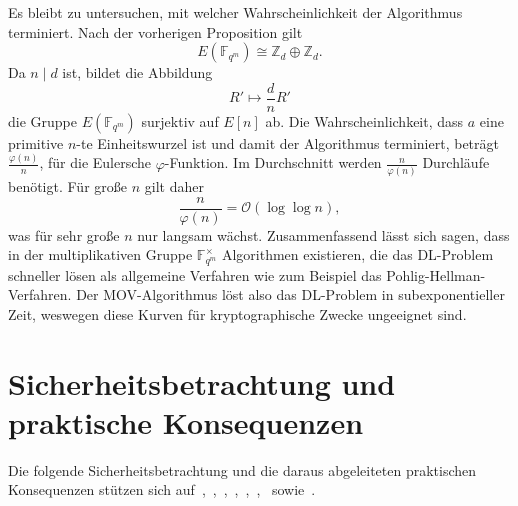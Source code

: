 Es bleibt zu untersuchen, mit welcher Wahrscheinlichkeit der Algorithmus terminiert. Nach der vorherigen Proposition gilt
\[
    E(\mathbb{F}_{q^m})
    \cong \mathbb{Z}_d\oplus\mathbb{Z}_d.
\]
Da $n\mid d$ ist, bildet die Abbildung
\[
    R'\longmapsto \frac{d}{n}R'
\]
die Gruppe $E(\mathbb F_{q^m})$ surjektiv auf $E[n]$ ab.
Die Wahrscheinlichkeit, dass $a$ eine primitive $n$-te Einheitswurzel ist und damit der Algorithmus terminiert, beträgt $\frac{\varphi(n)}{n}$, für die Eulersche $\varphi$-Funktion. Im Durchschnitt werden $\frac{n}{\varphi(n)}$ Durchläufe benötigt. Für große $n$ gilt daher
\[
\frac{n}{\varphi(n)}=\mathcal{O}(\log\log n),
\]
was für sehr große $n$ nur langsam wächst. Zusammenfassend lässt sich sagen, dass in der multiplikativen Gruppe $\mathbb{F}_{q^m}^\times$ Algorithmen existieren, die das DL-Problem schneller lösen als allgemeine Verfahren wie zum Beispiel das Pohlig-Hellman-Verfahren. Der MOV-Algorithmus löst also das DL-Problem in subexponentieller Zeit, weswegen diese Kurven für kryptographische Zwecke ungeeignet sind.

\section{Sicherheitsbetrachtung und praktische Konsequenzen}\label{sicherheitsbetrachtung}
Die folgende Sicherheitsbetrachtung und die daraus abgeleiteten
praktischen Konsequenzen stützen sich auf~\cite[S.~32--34, 57, 78, 82--83]{bundesamt26},~\cite[S.~225]{buell24},~\cite[S.~199--202]{fuß25},~\cite[S.~89--95, 97--98, 104--109]{werner02},~\cite[S.~169]{washington08},~\cite[S.~6]{silverman06},~\cite{smart99} sowie~\cite[S.~35--36]{nist23}.
